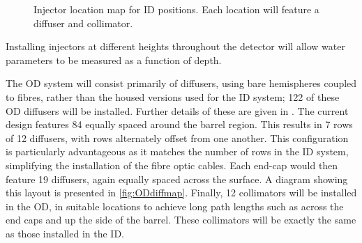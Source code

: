 \documentclass[a4paper,11pt]{article}
\begin{document}
\begin{figure}[h]
\caption{Injector location map for ID positions. Each location will feature a diffuser and collimator.}\label{fig:IDmap}
\end{figure}
Installing injectors at different heights throughout the detector will allow water parameters to be measured as a function of depth.

The OD system will consist primarily of diffusers, using bare hemispheres coupled to fibres, rather than the housed versions used for the ID system; 122 of these OD diffusers will be installed. Further details of these are given in \cite{bib:tn0111}. The current design features 84 equally spaced around the barrel region. This results in 7 rows of 12 diffusers, with rows alternately offset from one another. This configuration is particularly advantageous as it matches the number of rows in the ID system, simplifying the installation of the fibre optic cables. Each end-cap would then feature 19 diffusers, again equally spaced across the surface. A diagram showing this layout is presented in \cref{fig:ODdiffmap}. Finally, 12 collimators will be installed in the OD, in suitable locations to achieve long path lengths such as across the end caps and up the side of the barrel. These collimators will be exactly the same as those installed in the ID.
\end{document}
